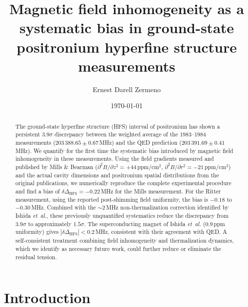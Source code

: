 \documentclass[twocolumn,pra,aps,superscriptaddress,floatfix,10pt]{revtex4-2}
\begin{document}
\title{Magnetic field inhomogeneity as a systematic bias in ground-state positronium hyperfine structure measurements}

\author{Ernest Darell Zermeno}

\date{\today}

\begin{abstract}
The ground-state hyperfine structure (HFS) interval of positronium has shown a persistent $3.9\sigma$ discrepancy between the weighted average of the 1983--1984 measurements ($203\,388.65 \pm 0.67$\,MHz) and the QED prediction ($203\,391.69 \pm 0.41$\,MHz). We quantify for the first time the systematic bias introduced by magnetic field inhomogeneity in these measurements. Using the field gradients measured and published by Mills \& Bearman ($\partial^2 B/\partial z^2 = +44$\,ppm/cm$^2$, $\partial^2 B/\partial r^2 = -21$\,ppm/cm$^2$) and the actual cavity dimensions and positronium spatial distributions from the original publications, we numerically reproduce the complete experimental procedure and find a bias of $\delta\Delta_\mathrm{HFS} = -0.22$\,MHz for the Mills measurement. For the Ritter measurement, using the reported post-shimming field uniformity, the bias is $-0.18$ to $-0.30$\,MHz. Combined with the $\sim 2$\,MHz non-thermalization correction identified by Ishida \textit{et~al.}, these previously unquantified systematics reduce the discrepancy from $3.9\sigma$ to approximately $1.5\sigma$. The superconducting magnet of Ishida \textit{et~al.} (0.9\,ppm uniformity) gives $|\delta\Delta_\mathrm{HFS}| < 0.2$\,MHz, consistent with their agreement with QED. A self-consistent treatment combining field inhomogeneity and thermalization dynamics, which we identify as necessary future work, could further reduce or eliminate the residual tension.
\end{abstract}

\maketitle

\section{Introduction}
\label{sec:intro}
\end{document}
